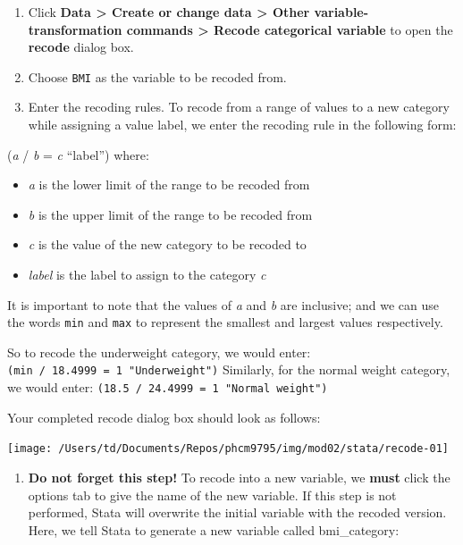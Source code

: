 \documentclass[
]{memoir}
\providecommand{\tightlist}{%
  \setlength{\itemsep}{0pt}\setlength{\parskip}{0pt}}
\begin{document}
\begin{enumerate}
\def\labelenumi{\arabic{enumi})}
\tightlist
\item
  Click \textbf{Data \textgreater{} Create or change data \textgreater{} Other variable-transformation commands \textgreater{} Recode categorical variable} to open the \textbf{recode} dialog box.
\item
  Choose \texttt{BMI} as the variable to be recoded from.
\item
  Enter the recoding rules. To recode from a range of values to a new category while assigning a value label, we enter the recoding rule in the following form:
\end{enumerate}

(\emph{a} / \emph{b} = \emph{c} ``label'') where:

\begin{itemize}
\tightlist
\item
  \emph{a} is the lower limit of the range to be recoded from
\item
  \emph{b} is the upper limit of the range to be recoded from
\item
  \emph{c} is the value of the new category to be recoded to
\item
  \emph{label} is the label to assign to the category \emph{c}
\end{itemize}

It is important to note that the values of \emph{a} and \emph{b} are inclusive; and we can use the words \texttt{min} and \texttt{max} to represent the smallest and largest values respectively.

So to recode the underweight category, we would enter: \texttt{(min\ /\ 18.4999\ =\ 1\ "Underweight")}
Similarly, for the normal weight category, we would enter: \texttt{(18.5\ /\ 24.4999\ =\ 1\ "Normal\ weight")}

Your completed recode dialog box should look as follows:

\texttt{[image: /Users/td/Documents/Repos/phcm9795/img/mod02/stata/recode-01]}

\begin{enumerate}
\def\labelenumi{\arabic{enumi})}
\setcounter{enumi}{3}
\tightlist
\item
  \textbf{Do not forget this step!} To recode into a new variable, we \textbf{must} click the options tab to give the name of the new variable. If this step is not performed, Stata will overwrite the initial variable with the recoded version. Here, we tell Stata to generate a new variable called bmi\_category:
\end{enumerate}
\end{document}
